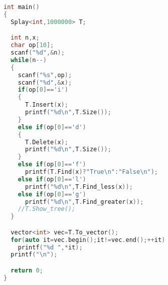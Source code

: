 \documentclass[UTF8]{report}
\numberwithin{figure}{subsection}
\numberwithin{table}{subsection}
\begin{document}
\begin{lstlisting}[language=c++]
int main()
{
  Splay<int,1000000> T;

  int n,x;
  char op[10];
  scanf("%d",&n);
  while(n--)
  {
    scanf("%s",op);
    scanf("%d",&x);
    if(op[0]=='i')
    {
      T.Insert(x);
      printf("%d\n",T.Size());
    }
    else if(op[0]=='d')
    {
      T.Delete(x);
      printf("%d\n",T.Size());
    }
    else if(op[0]=='f')
      printf(T.Find(x)?"True\n":"False\n");
    else if(op[0]=='l')
      printf("%d\n",T.Find_less(x));
    else if(op[0]=='g')
      printf("%d\n",T.Find_greater(x));
    //T.Show_tree();
  }

  vector<int> vec=T.To_vector();
  for(auto it=vec.begin();it!=vec.end();++it)
    printf("%d ",*it);
  printf("\n");

  return 0;
}
\end{lstlisting}
\end{document}
